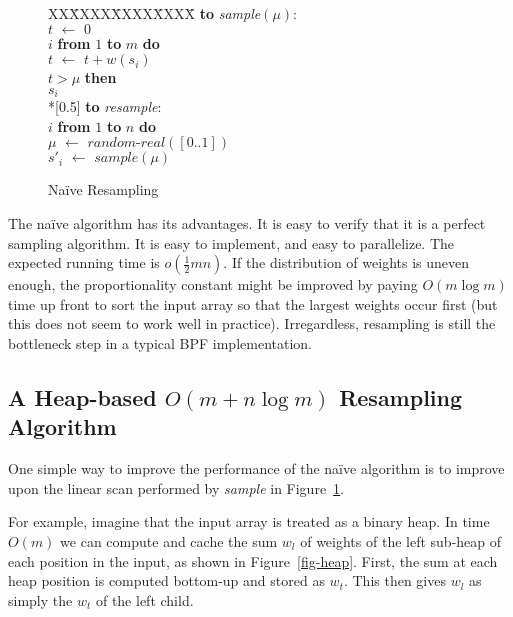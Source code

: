 \documentclass[12pt]{article}
\newcommand{\asgn}{\,\,\leftarrow\,\,}
\newcommand{\newcode}{\\*[0.5\baselineskip]}
\begin{document}
  \begin{figure}
    \centering
    \begin{minipage}{0.6\textwidth}
      \begin{tabbing}
      XX\=XXXX\=XXXX\=XXXX\=\kill
      {\bf to} {\it sample}$(\mu)$: \\
      \>$t \asgn 0$ \\
       $i$ {\bf from} $1$ {\bf to} $m$ {\bf do} \\
      \>\>$t \asgn t + w(s_i)$ \\
      \> $t > \mu$ {\bf then} \\
      \>\> $s_i$ \newcode
      {\bf to} {\it resample}: \\
       $i$ {\bf from} $1$ {\bf to} $n$ {\bf do} \\
      \>\>$\mu \asgn \textit{random-real}([0..1])$ \\
      \>\>$s'_i \asgn sample(\mu)$
      \end{tabbing}
    \end{minipage}
    \caption{Na\"ive Resampling}\label{fig-omn}
  \end{figure}

  The na\"ive algorithm has its advantages.  It is easy to
  verify that it is a perfect sampling algorithm.  It is
  easy to implement, and easy to parallelize.  The expected
  running time is $o(\frac{1}{2}mn)$.  If the distribution
  of weights is uneven enough, the proportionality constant
  might be improved by paying $O(m \log m)$ time up front to
  sort the input array so that the largest weights occur
  first (but this does not seem to work well in practice).
  Irregardless, resampling is still the bottleneck step in a
  typical BPF implementation.

\subsection{A Heap-based $O(m + n \log m)$ Resampling Algorithm}\label{sec-heap}

  One simple way to improve the performance of the na\"ive
  algorithm is to improve upon the linear scan performed by
  {\em sample} in Figure~\ref{fig-omn}.

  For example, imagine that the input array is treated as a
  binary heap.  In time $O(m)$ we can compute and cache the
  sum $w_l$ of weights of the left sub-heap of each position
  in the input, as shown in Figure~\ref{fig-heap}.  First,
  the sum at each heap position is computed bottom-up and
  stored as $w_t$.  This then gives $w_l$ as simply the
  $w_t$ of the left child.
\end{document}

